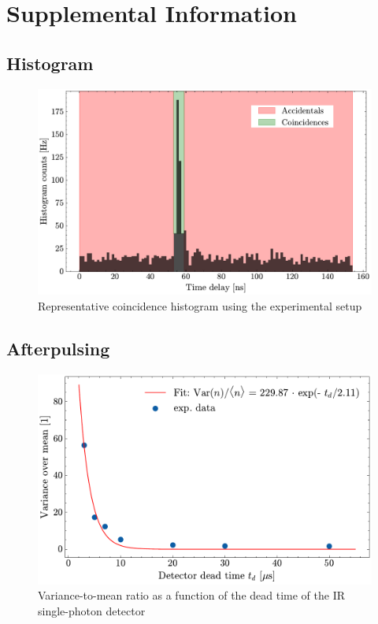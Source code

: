 \chapter{Supplemental Information}

\section*{Histogram}
\begin{figure}[h!]
	\centering
	\includegraphics[width=.7\textwidth]{Images/HistogramExample.pdf}
	\caption{Representative coincidence histogram using the experimental setup}
	\label{fig:HistExamAcc}
\end{figure}

\section*{Afterpulsing}
\begin{figure}[h!]
	\centering
	\includegraphics[width=.7\textwidth]{Images/VarMean_DeadTime_Afterpulsing.pdf}
	\caption{Variance-to-mean ratio as a function of the dead time of the IR single-photon detector}
	\label{fig:VoMDead}
\end{figure}
\newpage
